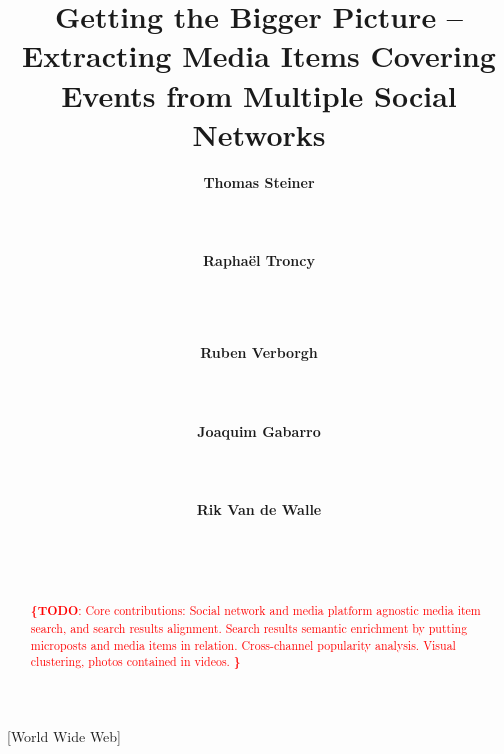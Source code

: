 \documentclass{acm_proc_article-sp}
\newcommand{\todo}[1]{\noindent\textcolor{red}{{\bf \{TODO}: #1{\bf \}}}}
\begin{document}
\title{Getting the Bigger Picture -- Extracting Media Items Covering Events from Multiple Social Networks}

\author{
\alignauthor
\textbf{Thomas Steiner}\\
	\\
	\\
	\\
\alignauthor
\textbf{Raphaël Troncy}\\
	\\
	\\
	\\
\and
\alignauthor
\textbf{Ruben Verborgh}\\ 	
	\\
	\\
	\\
\alignauthor
\textbf{Joaquim Gabarro}\\
	\\
	\\
	\\
\alignauthor
\textbf{Rik Van de Walle}\\
	\\
	\\
	\\
}

\maketitle

\begin{abstract}
\todo{
Core contributions:
Social network and media platform agnostic media item search, and search results alignment.
Search results semantic enrichment by putting microposts and media items in relation.
Cross-channel popularity analysis.
Visual clustering, photos contained in videos.
}
\end{abstract}

[World Wide Web]
\end{document}
